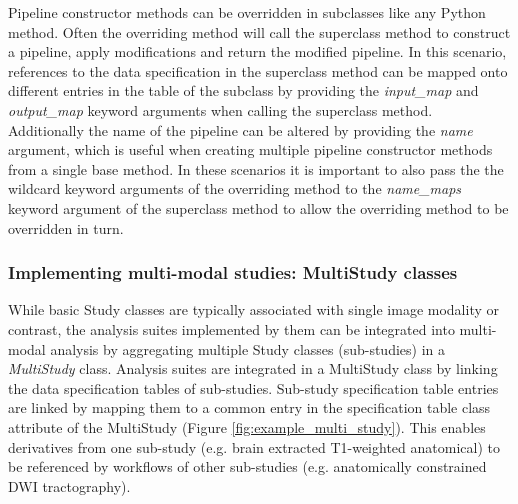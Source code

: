 \documentclass[smallextended]{svjour3}       %
\begin{document}
Pipeline constructor methods can be overridden in subclasses like any Python
method. Often the overriding method will call the superclass method
to construct a pipeline, apply modifications and return the
modified pipeline. In this scenario, references to the data
specification in the superclass method can be mapped onto different
entries in the table of the subclass by providing the \emph{input\_map} and
\emph{output\_map} keyword arguments when calling the superclass method.
Additionally the name of the pipeline can be altered by providing the \emph{name}
argument, which is useful when creating multiple pipeline constructor methods
from a single base method. In these scenarios it is important to
also pass the the wildcard keyword arguments of the overriding method to the
\emph{name\_maps} keyword argument of the superclass method to allow the
overriding method to be overridden in turn.


\subsubsection*{Implementing multi-modal studies: MultiStudy classes}
\label{implementing-multi-modal-studies}

While basic Study classes are typically associated with single image
modality or contrast, the analysis suites implemented by them can be
integrated into multi-modal analysis by aggregating multiple Study
classes (sub-studies) in a \emph{MultiStudy} class. Analysis suites are
integrated in a MultiStudy class by linking the data specification tables
of sub-studies. Sub-study specification table entries are linked by mapping
them to a common entry in the specification table class attribute
of the MultiStudy (Figure \ref{fig:example_multi_study}). This enables derivatives from one
sub-study (e.g. brain extracted T1-weighted anatomical) to be referenced
by workflows of other sub-studies (e.g. anatomically constrained DWI
tractography).
\end{document}
